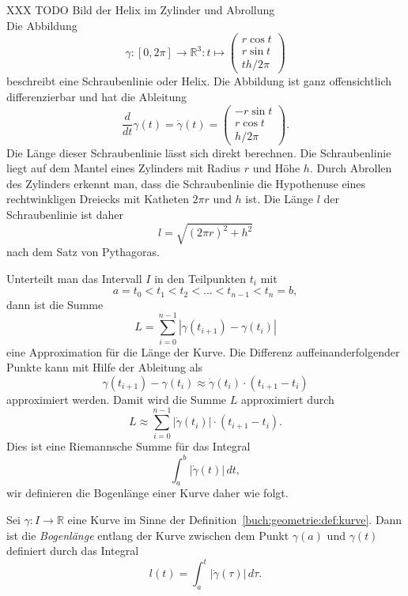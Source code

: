 \begin{beispiel}
XXX TODO Bild der Helix im Zylinder und Abrollung
\\
Die Abbildung
\begin{equation}
\gamma
\colon
[0,2\pi] \to \mathbb{R}^3
:
t\mapsto\begin{pmatrix}r\cos t\\ r\sin t\\ th/2\pi\end{pmatrix}
\label{buch:geometrie:eqn:helix}
\end{equation}
beschreibt eine Schraubenlinie oder Helix.
%
%
Die Abbildung ist ganz offensichtlich differenzierbar und hat die
Ableitung
\begin{equation}
\frac{d}{dt}\gamma(t)
=
\dot{\gamma}(t)
=
\begin{pmatrix} -r\sin t \\ r\cos t \\ h/2\pi\end{pmatrix}.
\label{buch:geometrie:eqn:helixdot}
\end{equation}
Die Länge dieser Schraubenlinie lässt sich direkt berechnen.
Die Schraubenlinie liegt auf dem Mantel eines Zylinders mit
Radius $r$ und Höhe $h$.
Durch Abrollen des Zylinders erkennt man, dass die Schraubenlinie
die Hypothenuse eines rechtwinkligen Dreiecks mit Katheten 
$2\pi r$ und $h$ ist.
Die Länge $l$ der Schraubenlinie ist daher
\begin{equation}
l = \sqrt{(2\pi r)^2 +h^2}
\label{buch:geometrie:eqn:helixlaenge}
\end{equation}
nach dem Satz von Pythagoras.
\end{beispiel}

Unterteilt man das Intervall $I$ in den Teilpunkten $t_i$ mit
\[
a = t_0 < t_1 < t_2 < \dots < t_{n-1} < t_n = b,
\]
dann ist die Summe
\[
L
=
\sum_{i=0}^{n-1} |\gamma(t_{i+1}) - \gamma(t_{i})|
\]
eine Approximation für die Länge der Kurve.
Die Differenz auffeinanderfolgender Punkte kann mit Hilfe der
Ableitung als
\[
\gamma(t_{i+1})-\gamma(t_i)
\approx
\dot{\gamma}(t_{i}) \cdot (t_{i+1}-t_i)
\]
approximiert werden.
Damit wird die Summe $L$ approximiert durch
\[
L\approx \sum_{i=0}^{n-1} |\dot{\gamma}(t_i)| \cdot (t_{i+1}-t_i).
\]
Dies ist eine Riemannsche Summe für das Integral
\[
\int_a^b |\dot{\gamma}(t)|\,dt,
\]
wir definieren die Bogenlänge einer Kurve daher wie folgt.

\begin{definition}
\label{buch:geometrie:def:kurvenlaenge}
Sei $\gamma\colon I\to\mathbb{R}$ eine Kurve im Sinne der
Definition~\ref{buch:geometrie:def:kurve}.
Dann ist die {\em Bogenlänge} entlang der Kurve zwischen dem Punkt
$\gamma(a)$ und $\gamma(t)$ definiert durch das
Integral
\[
l(t) = \int_{a}^t |\dot{\gamma}(\tau)|\,d\tau.
\]
\end{definition}

